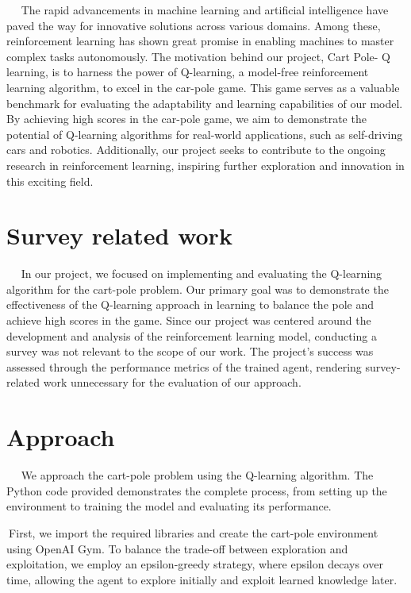 \documentclass{article}
\begin{document}
$\>$    $\>$   $\>$The rapid advancements in machine learning and artificial intelligence have paved the way for innovative solutions across various domains. Among these, reinforcement learning has shown great promise in enabling machines to master complex tasks autonomously. The motivation behind our project, Cart Pole- Q learning, is to harness the power of Q-learning, a model-free reinforcement learning algorithm, to excel in the car-pole game. This game serves as a valuable benchmark for evaluating the adaptability and learning capabilities of our model. By achieving high scores in the car-pole game, we aim to demonstrate the potential of Q-learning algorithms for real-world applications, such as self-driving cars and robotics. Additionally, our project seeks to contribute to the ongoing research in reinforcement learning, inspiring further exploration and innovation in this exciting field.
 \section{Survey related work}
 $\>$    $\>$   $\>$In our project, we focused on implementing and evaluating the Q-learning algorithm for the cart-pole problem. Our primary goal was to demonstrate the effectiveness of the Q-learning approach in learning to balance the pole and achieve high scores in the game. Since our project was centered around the development and analysis of the reinforcement learning model, conducting a survey was not relevant to the scope of our work. The project's success was assessed through the performance metrics of the trained agent, rendering survey-related work unnecessary for the evaluation of our approach.
  
 
 
\section{Approach}

$\>$    $\>$   $\>$We approach the cart-pole problem using the Q-learning algorithm. The Python code provided demonstrates the complete process, from setting up the environment to training the model and evaluating its performance.

$\>$First, we import the required libraries and create the cart-pole environment using OpenAI Gym. To balance the trade-off between exploration and exploitation, we employ an epsilon-greedy strategy, where epsilon decays over time, allowing the agent to explore initially and exploit learned knowledge later.
\end{document}
